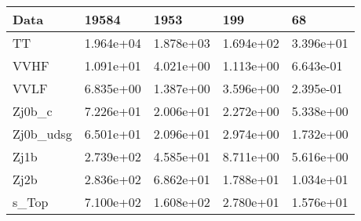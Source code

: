 \begin{table}
{\begin{tabularx}{\textwidth}{|X|X|X|X|X|}
\hline
Data & 19584 & 1953 & 199 & 68 \\
\hline
TT & 1.964e+04 & 1.878e+03 & 1.694e+02 & 3.396e+01 \\
VVHF & 1.091e+01 & 4.021e+00 & 1.113e+00 & 6.643e-01 \\
VVLF & 6.835e+00 & 1.387e+00 & 3.596e+00 & 2.395e-01 \\
Zj0b\_c & 7.226e+01 & 2.006e+01 & 2.272e+00 & 5.338e+00 \\
Zj0b\_udsg & 6.501e+01 & 2.096e+01 & 2.974e+00 & 1.732e+00 \\
Zj1b & 2.739e+02 & 4.585e+01 & 8.711e+00 & 5.616e+00 \\
Zj2b & 2.836e+02 & 6.862e+01 & 1.788e+01 & 1.034e+01 \\
s\_Top & 7.100e+02 & 1.608e+02 & 2.780e+01 & 1.576e+01 \\
\hline
\end{tabularx}
}
\label{tab:cr-Zee-2018}
\end{table}

